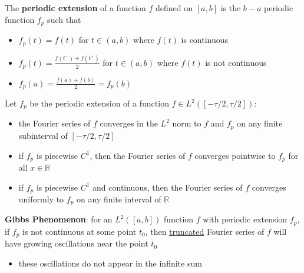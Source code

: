 \documentclass[11pt]{article}
\begin{document}
The \textbf{periodic extension} of a function \(f\) defined on \([a,b]\) is the \(b-a\) periodic
function \(f_{p}\) such that
\begin{itemize}
\item \(f_{p}(t) = f(t)\) for \(t \in (a,b)\) where \(f(t)\) is continuous
\item \(f_{p}(t) = \frac{f(t^{-}) + f(t^{+})}{2}\) for \(t \in (a,b)\) where \(f(t)\) is not continuous
\item \(f_{p}(a) = \frac{f(a) + f(b)}{2} = f_{p}(b)\)
\end{itemize}

Let \(f_{p}\) be the periodic extension of a function \(f \in L^{2}([-\tau/2, \tau/2])\):
\begin{itemize}
\item the Fourier series of \(f\) converges in the \(L^{2}\) norm to \(f\) and \(f_{p}\) on any finite
subinterval of \([-\tau/2, \tau/2]\)
\item if \(f_{p}\) is piecewise \(C^{1}\), then the Fourier series of \(f\) converges pointwise to
\(f_{p}\) for all \(x \in \mathbb{R}\)
\item if \(f_{p}\) is piecewise \(C^{1}\) and continuous, then the Fourier series of \(f\) converges
uniformly to \(f_{p}\) on any finite interval of \(\mathbb{R}\)
\end{itemize}

\textbf{Gibbs Phenomenon}: for an \(L^{2}([a,b])\) function \(f\) with periodic extension \(f_{p}\),
if \(f_{p}\) is not continuous at some point \(t_{0}\), then \uline{truncated} Fourier series of
\(f\) will have growing oscillations near the point \(t_{0}\)
\begin{itemize}
\item these oscillations do not appear in the infinite sum
\end{itemize}
\end{document}
